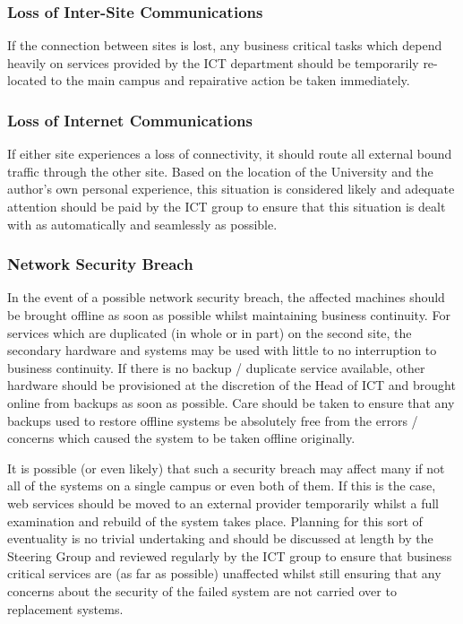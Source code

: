\documentclass[a4paper, twoside]{article}
\begin{document}
\subsubsection{Loss of Inter-Site Communications}
If the connection between sites is lost, any business critical tasks which
depend heavily on services provided by the ICT department should be temporarily
re-located to the main campus and repairative action be taken immediately.

\subsubsection{Loss of Internet Communications}
If either site experiences a loss of connectivity, it should route all external
bound traffic through the other site. Based on the location of the University
and the author's own personal experience, this situation is considered likely
and adequate attention should be paid by the ICT group to ensure that this
situation is dealt with as automatically and seamlessly as possible.

\subsubsection{Network Security Breach}
In the event of a possible network security breach, the affected machines should
be brought offline as soon as possible whilst maintaining business continuity.
For services which are duplicated (in whole or in part) on the second site, the
secondary hardware and systems may be used with little to no interruption to
business continuity. If there is no backup / duplicate service available, other
hardware should be provisioned at the discretion of the Head of ICT and brought
online from backups as soon as possible. Care should be taken to ensure that any
backups used to restore offline systems be absolutely free from the
errors / concerns which caused the system to be taken offline originally.

It is possible (or even likely) that such a security breach may affect many if
not all of the systems on a single campus or even both of them. If this is the
case, web services should be moved to an external provider temporarily whilst a
full examination and rebuild of the system takes place. Planning for this sort
of eventuality is no trivial undertaking and should be discussed at length by
the Steering Group and reviewed regularly by the ICT group to ensure that
business critical services are (as far as possible) unaffected whilst still
ensuring that any concerns about the security of the failed system are not
carried over to replacement systems.
\end{document}
